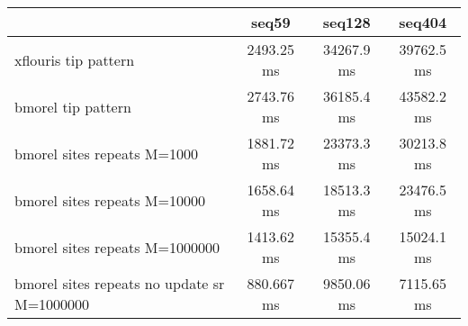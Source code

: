\begin{tabular}{|l|c|c|c|}
\hline
 & seq59 & seq128 & seq404  \\
\hline
xflouris tip pattern & 2493.25 ms & 34267.9 ms & 39762.5 ms\\
\hline
bmorel tip pattern & 2743.76 ms & 36185.4 ms & 43582.2 ms\\
\hline
bmorel sites repeats M=1000 & 1881.72 ms & 23373.3 ms & 30213.8 ms\\
\hline
bmorel sites repeats M=10000 & 1658.64 ms & 18513.3 ms & 23476.5 ms\\
\hline
bmorel sites repeats M=1000000 & 1413.62 ms & 15355.4 ms & 15024.1 ms\\
\hline
bmorel sites repeats no update sr  M=1000000 & 880.667 ms & 9850.06 ms & 7115.65 ms\\
\hline
\end{tabular}
